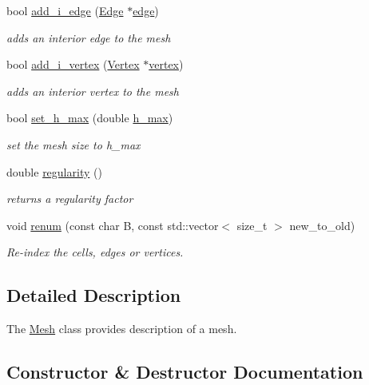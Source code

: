 \begin{DoxyCompactItemize}
bool \hyperlink{group__Mesh_ga24c3b59a00bd3c7ac51bc868807c3ff4}{add\+\_\+i\+\_\+edge} (\hyperlink{classHArDCore3D_1_1Edge}{Edge} $\ast$\hyperlink{classHArDCore3D_1_1Mesh_acad7cdf3d2c00fa6fc23ff77c63c7d1a}{edge})
\begin{DoxyCompactList}\small\item\em adds an interior edge to the mesh \end{DoxyCompactList}\item 
bool \hyperlink{group__Mesh_gac084d96b6ffab6ff330cdd3aaf8dd424}{add\+\_\+i\+\_\+vertex} (\hyperlink{classHArDCore3D_1_1Vertex}{Vertex} $\ast$\hyperlink{classHArDCore3D_1_1Mesh_ad099224c697c05a57fad6a47fdcd9e76}{vertex})
\begin{DoxyCompactList}\small\item\em adds an interior vertex to the mesh \end{DoxyCompactList}\item 
bool \hyperlink{group__Mesh_gafdbe174b87d591e573dd1953650744ec}{set\+\_\+h\+\_\+max} (double \hyperlink{group__Mesh_gadb86f1eadf808e15e90881d626b467c0}{h\+\_\+max})
\begin{DoxyCompactList}\small\item\em set the mesh size to h\+\_\+max \end{DoxyCompactList}\item 
double \hyperlink{classHArDCore3D_1_1Mesh_a9bdfdf3e4528832da6925f96edc5ad8f}{regularity} ()
\begin{DoxyCompactList}\small\item\em returns a regularity factor \end{DoxyCompactList}\item 
void \hyperlink{classHArDCore3D_1_1Mesh_af77873bbc892a7a5b37bf4773c55aefc}{renum} (const char B, const std\+::vector$<$ size\+\_\+t $>$ new\+\_\+to\+\_\+old)
\begin{DoxyCompactList}\small\item\em Re-\/index the cells, edges or vertices. \end{DoxyCompactList}\end{DoxyCompactItemize}


\subsection{Detailed Description}
The \hyperlink{classHArDCore3D_1_1Mesh}{Mesh} class provides description of a mesh. 

\subsection{Constructor \& Destructor Documentation}
\mbox{\label{classHArDCore3D_1_1Mesh_a2af137f1571af89172b9c102302c416b}} 
